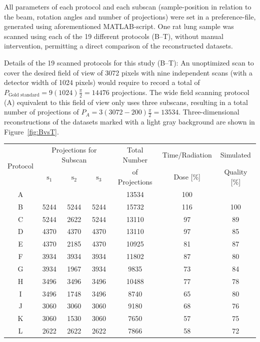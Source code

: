 All parameters of each protocol and each subscan (sample-position in relation to the beam, rotation angles and number of projections) were set in a preference-file, generated using aforementioned MATLAB-script. One rat lung sample was scanned using each of the 19 different protocols (B--T), without manual intervention, permitting a direct comparison of the reconstructed datasets.

\begin{threeparttable}
	\caption[Details of the 19 scanned protocols]{Details of the 19 scanned protocols for this study (B--T): An unoptimized scan to cover the desired field of view of 3072 pixels with nine independent scans (with a detector width of 1024 pixels) would require to record a total of $P_{\textrm{Gold standard}}=9(1024)\frac{\pi}{2}=14476$ projections. The wide field scanning protocol (A) equivalent to this field of view only uses three subscans, resulting in a total number of projections of $P_{A} = 3(3072-200)\frac{\pi}{2}= 13534$. Three-dimensional reconstructions of the datasets marked with a light gray background are shown in Figure~\ref{fig:BvsT}.}
	\label{tab:protocols}
	\begin{tabular}{ccccccc}
		\toprule
		\multirow{2}{*}{Protocol} & \multicolumn{3}{c}{Projections for Subscan} & Total Number & Time/Radiation & Simulated\\
			& $\textrm{s}_{1}$ & $\textrm{s}_{2}$ & $\textrm{s}_{3}$        & of Projections & Dose [\%] & Quality [\%]\\
		\midrule
		A\tnote{1} & & & & 13534 & 100 & \\
		\rowcolor{lightgray} B\tnote{2} & 5244 & 5244 & 5244 & 15732 & 116 & 100\\
		C & 5244 & 2622 & 5244 & 13110 &  97 & 89\\
		D & 4370 & 4370 & 4370 & 13110 &  97 & 85\\
		E & 4370 & 2185 & 4370 & 10925 &  81 & 87\\
		F & 3934 & 3934 & 3934 & 11802 &  87 & 80\\
		G & 3934 & 1967 & 3934 & 9835  &  73 & 84\\
		H & 3496 & 3496 & 3496 & 10488 &  77 & 78\\
		I & 3496 & 1748 & 3496 & 8740  &  65 & 80\\
		J & 3060 & 3060 & 3060 & 9180  &  68 & 76\\
		K & 3060 & 1530 & 3060 & 7650  &  57 & 75\\
		\rowcolor{lightgray} L  & 2622 & 2622 & 2622 & 7866  &  58 & 72\\

\end{tabular}
\end{threeparttable}
